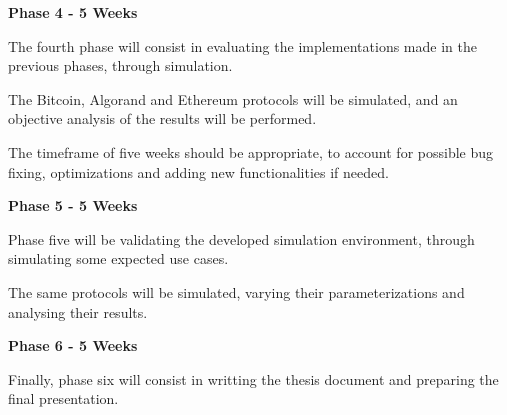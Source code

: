 \vspace{0.5cm}

\textbf{Phase 4 - 5 Weeks}

The fourth phase will consist in evaluating the implementations made in the previous phases, through simulation.

The Bitcoin, Algorand and Ethereum protocols will be simulated, and an objective analysis of the results will be performed.

The timeframe of five weeks should be appropriate, to account for possible bug fixing, optimizations and adding new functionalities if needed.

\vspace{0.5cm}

\textbf{Phase 5 - 5 Weeks}

Phase five will be validating the developed simulation environment, through simulating some expected use cases.

The same protocols will be simulated, varying their parameterizations and analysing their results.

\vspace{0.5cm}

\textbf{Phase 6 - 5 Weeks}

Finally, phase six will consist in writting the thesis document and preparing the final presentation.


